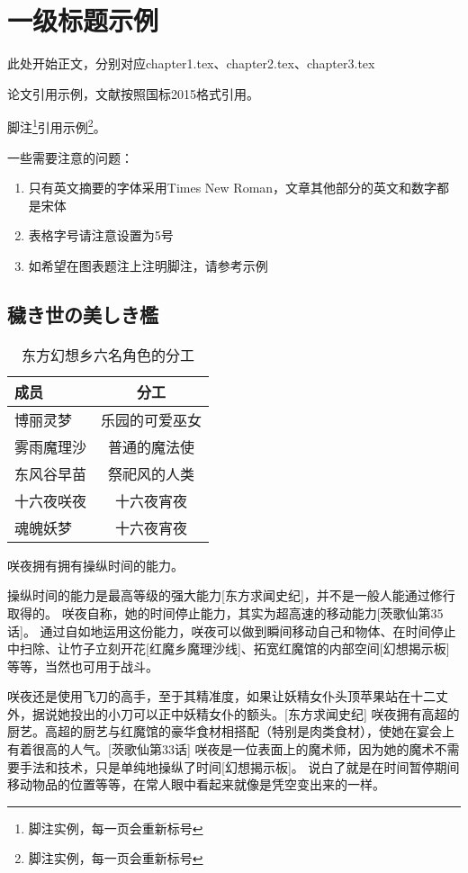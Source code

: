\chapter{一级标题示例}
此处开始正文，分别对应chapter1.tex、chapter2.tex、chapter3.tex

论文引用示例\cite{王宣承-1}，文献按照国标2015格式引用。

脚注\footnote{脚注实例，每一页会重新标号}引用示例\footnote{脚注实例，每一页会重新标号}。

一些需要注意的问题：
\begin{enumerate}
    \item 只有英文摘要的字体采用Times New Roman，文章其他部分的英文和数字都是宋体
    \item 表格字号请注意设置为5号
    \item 如希望在图表题注上注明脚注，请参考示例
\end{enumerate}

\section{穢き世の美しき檻}

\begin{table}
    \centering
    \small
    \caption{东方幻想乡六名角色的分工}
    \begin{tabular}{lc}
        \toprule[1.5bp]
        成员    & 分工      \\
        \midrule[0.75bp]
        博丽灵梦  & 乐园的可爱巫女 \\
        雾雨魔理沙 & 普通的魔法使  \\
        东风谷早苗 & 祭祀风的人类  \\
        十六夜咲夜 & 十六夜宵夜   \\
        魂魄妖梦  & 十六夜宵夜   \\
        \bottomrule[1.5bp]
    \end{tabular}
    \vspace{17bp}
\end{table}

咲夜拥有拥有操纵时间的能力。

操纵时间的能力是最高等级的强大能力[东方求闻史纪]，并不是一般人能通过修行取得的。
咲夜自称，她的时间停止能力，其实为超高速的移动能力[茨歌仙第35话]。
通过自如地运用这份能力，咲夜可以做到瞬间移动自己和物体、在时间停止中扫除、让竹子立刻开花[红魔乡魔理沙线]、拓宽红魔馆的内部空间[幻想揭示板]等等，当然也可用于战斗。

咲夜还是使用飞刀的高手，至于其精准度，如果让妖精女仆头顶苹果站在十二丈外，据说她投出的小刀可以正中妖精女仆的额头。[东方求闻史纪]
咲夜拥有高超的厨艺。高超的厨艺与红魔馆的豪华食材相搭配（特别是肉类食材），使她在宴会上有着很高的人气。[茨歌仙第33话]
咲夜是一位表面上的魔术师，因为她的魔术不需要手法和技术，只是单纯地操纵了时间[幻想揭示板]。 说白了就是在时间暂停期间移动物品的位置等等，在常人眼中看起来就像是凭空变出来的一样。
